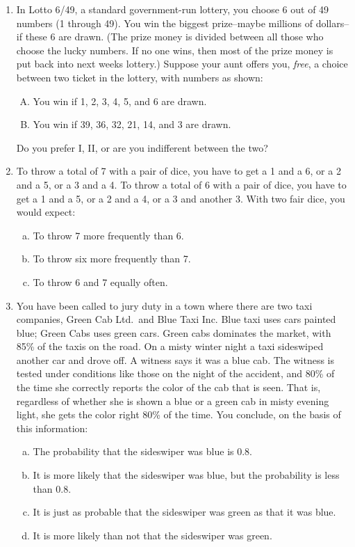 \documentclass[11pt]{article}
\begin{document}
\begin{enumerate}
  	\item In Lotto 6/49, a standard government-run lottery, you choose 6 out of 49 numbers (1 			through 49). You win the biggest prize--maybe millions of dollars--if these 6 are drawn. (The 			prize money is divided between all those who choose the lucky numbers. If no one wins, then 		most of the prize money is put back into next weeks lottery.)
	Suppose your aunt offers you, \emph{free}, a choice between two ticket in the lottery, with 			numbers as shown:
	\begin{enumerate}[A.]
		\item You win if 1, 2, 3, 4, 5, and 6 are drawn.
		\item You win if 39, 36, 32, 21, 14, and 3 are drawn.
	\end{enumerate}
	Do you prefer I, II, or are you indifferent between the two?
	
	\item To throw a total of 7 with a pair of dice, you have to get a 1 and a 6, or a 2 and a 5, or a 3 		and a 4. To throw a total of 6 with a pair of dice, you have to get a 1 and a 5, or a 2 and a 4, or a 3 		and another 3. With two fair dice, you would expect:
		\begin{enumerate}[(a)]
			\item To throw 7 more frequently than 6.
			\item To throw six more frequently than 7.
			\item To throw 6 and 7 equally often.
		\end{enumerate}
		
	\item You have been called to jury duty in a town where there are two taxi companies, Green 			Cab Ltd.\ and Blue Taxi Inc. Blue taxi uses cars painted blue; Green Cabs uses green cars. Green 		cabs dominates the market, with 85\% of the taxis on the road. On a misty winter night a taxi 		sideswiped another car and drove off. A witness says it was a blue cab. The witness is tested 			under conditions like those on the night of the accident, and 80\% of the time she correctly 			reports the color of the cab that is seen. That is, regardless of whether she is shown a blue or a 		green cab in misty evening light, she gets the color right 80\% of the time. You conclude, on the 		basis of this information:
	\begin{enumerate}[(a)]
		\item The probability that the sideswiper was blue is 0.8.
		\item It is more likely that the sideswiper was blue, but the probability is less than 0.8. 
		\item It is just as probable that the sideswiper was green as that it was blue. 
		\item It is more likely than not that the sideswiper was green.
	\end{enumerate}
	

\end{enumerate}
\end{document}
